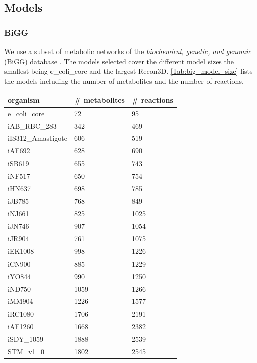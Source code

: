\subsection{Models} \label{section:models}
\subsubsection{BiGG}
We use a subset of metabolic networks of the \textit{biochemical, genetic, and genomic} (BiGG) database \cite{BiGG}. The models selected cover the different model sizes the smallest being \textsf{e\_coli\_core} and the largest \textsf{Recon3D}. \cref{Tab:big_model_size} lists the models including the number of metabolites and the number of reactions.

\begin{table}[!ht]
    \centering
    \small
    \begin{tabular}{lll}
    \hline
        \textbf{organism} & \textbf{\# metabolites} & \textbf{\# reactions} \\ \hline
        e\_coli\_core & 72 & 95 \\ 
        iAB\_RBC\_283 & 342 & 469 \\ 
        iIS312\_Amastigote & 606 & 519 \\ 
        iAF692 & 628 & 690 \\ 
        iSB619 & 655 & 743 \\ 
        iNF517 & 650 & 754 \\ 
        iHN637 & 698 & 785 \\ 
        iJB785 & 768 & 849 \\ 
        iNJ661 & 825 & 1025 \\ 
        iJN746 & 907 & 1054 \\ 
        iJR904 & 761 & 1075 \\ 
        iEK1008 & 998 & 1226 \\ 
        iCN900 & 885 & 1229 \\ 
        iYO844 & 990 & 1250 \\ 
        iND750 & 1059 & 1266 \\ 
        iMM904 & 1226 & 1577 \\ 
        iRC1080 & 1706 & 2191 \\ 
        iAF1260 & 1668 & 2382 \\ 
        iSDY\_1059 & 1888 & 2539 \\ 
        STM\_v1\_0 & 1802 & 2545 \\ 

\end{tabular}
\end{table}
